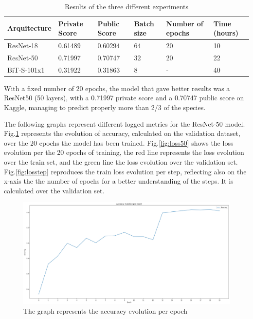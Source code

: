 \documentclass{article}
\begin{document}
\begin{table}[h]
  \caption{Results of the three different experiments}
  \label{results}
  \centering
  \begin{tabular}{llllll}
    \toprule
    Arquitecture     & Private Score    & Public Score  & Batch size  &  Number of epochs    & Time (hours)   \\
    \midrule
    ResNet-18 & 0.61489  &   0.60294  & 64 & 20    & 10 \\
    ResNet-50     & 0.71997 & 0.70747 & 32 & 20  & 22  \\
    BiT-S-101x1     & 0.31922  & 0.31863 & 8  & - & 40 \\
    \bottomrule
  \end{tabular}
\end{table}


With a fixed number of 20 epochs, the model that gave better results was a ResNet50 (50 layers), with a 0.71997 private score and a 0.70747 public score on Kaggle, managing to predict properly more than 2/3 of the species. 

The following graphs represent different logged metrics for the ResNet-50 model. Fig.\ref{fig:acc50} represents the evolution of accuracy, calculated on the validation dataset, over the 20 epochs the model has been trained. Fig.\ref{fig:loss50} shows the loss evolution per the 20 epochs of training, the red line represents the loss evolution over the train set, and the green line the loss evolution over the validation set.  Fig.\ref{fig:losstep} reproduces the train loss evolution per step, reflecting also on the x-axis the
the number of epochs for a better understanding of the steps. It is calculated over the validation set.
\begin{figure}[h]
    \centering
    \includegraphics[width=13cm]{acc50}
    \caption{The graph represents the accuracy evolution per epoch}
    \label{fig:acc50}

\end{figure}
\end{document}
